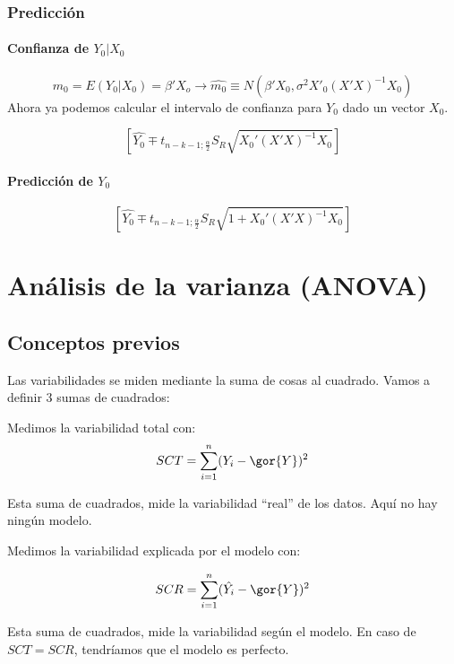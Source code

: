 \subsubsection{Predicción}

\paragraph{Confianza de $Y_0 | X_0$}
\[
m_0 = E(Y_0 | X_0) = β'X_o \to \hat{m_0} \equiv N\left( β'X_0 , σ^2X'_0(X'X)^{-1}X_0 \right)
\]
Ahora ya podemos calcular el intervalo de confianza para $Y_0$ dado un vector $X_0$.

\[
\left[ \hat{Y_0} \mp t_{n-k-1;\frac{α}{2}} S_R\sqrt{X_0'(X'X)^{-1}X_0} \right]
\]


\paragraph{Predicción de $Y_0$}

\[
\left[ \hat{Y_0} \mp t_{n-k-1;\frac{α}{2}} S_R\sqrt{1+X_0'(X'X)^{-1}X_0} \right]
\]

\section{Análisis de la varianza (ANOVA)}

\subsection{Conceptos previos}
Las variabilidades se miden mediante la suma de cosas al cuadrado. Vamos a definir 3 sumas de cuadrados:

\begin{defn}
Medimos la variabilidad total con:
\[SCT = \sum_{i=1}^n (Y_i - \gor{Y})^2\]

Esta suma de cuadrados, mide la variabilidad ``real'' de los datos. Aquí no hay ningún modelo.
\end{defn}

\begin{defn}
Medimos la variabilidad explicada por el modelo con:

\[SCR = \sum_{i=1}^n (\hat{Y_i} - \gor{Y})^2\]

Esta suma de cuadrados, mide la variabilidad según el modelo. En caso de $SCT = SCR$, tendríamos que el modelo es perfecto.
\end{defn}



